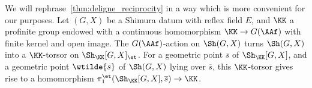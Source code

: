 We will rephrase~\ref{thm:deligne_reciprocity} in a way which is more convenient for our purposes. Let $(G,X)$ be a Shimura datum with reflex field $E$, and $\KK$ a profinite group endowed with a continuous homomorphism $\KK \rightarrow G(\AAf)$ with finite kernel and open image. The $G(\AAf)$-action on $\Sh(G,X)$ turns $\Sh(G,X)$ into a $\KK$-torsor on $\Sh_{\KK}[G,X]_{\et}$. For a geometric point $\overline{s}$ of $\Sh_{\KK}[G,X]$, and a geometric point $\wtilde{s}$ of $\Sh(G,X)$ lying over $\overline{s}$, this $\KK$-torsor gives rise to a homomorphism $\pi_1^{\et}(\Sh_{\KK}[G,X],\overline{s}) \rightarrow \KK$.




%

